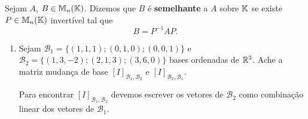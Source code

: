 \begin{definicao}
    Sejam $A$, $B \in \mathbb{M}_n(\mathbb{K})$. Dizemos que $B$ é \textbf{semelhante} a $A$ sobre $\mathbb{K}$ se existe $P \in \mathbb{M}_n(\mathbb{K})$ invertível tal que
    \[
        B = P^{-1}AP.
    \]
\end{definicao}

\begin{exemplos}
    \begin{enumerate}[label={\arabic*})]
        \item Sejam $\mathcal{B}_1 = \{(1, 1, 1); (0, 1, 0); (0, 0, 1)\}$ e $\mathcal{B}_2 = \{(1, 3, -2); (2, 1, 3); (3, 6, 0)\}$ bases ordenadas de $\mathbb{R}^3$. Ache a matriz mudança de base $[I]_{\mathcal{B}_1, \mathcal{B}_2}$ e $[I]_{\mathcal{B}_2, \mathcal{B}_1}$.
        \begin{solucao}
            Para encontrar $[I]_{\mathcal{B}_1, \mathcal{B}_2}$ devemos escrever os vetores de $\mathcal{B}_2$ como combinação linear dos vetores de $\mathcal{B}_1$.


\end{solucao}
\end{enumerate}
\end{exemplos}
